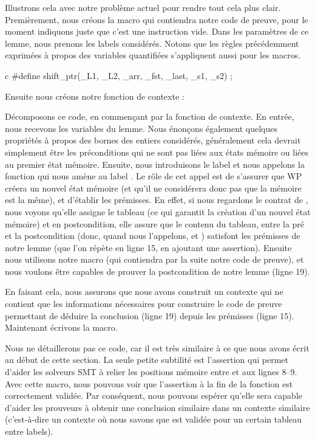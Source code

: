 Illustrons cela avec notre problème actuel pour rendre tout cela plus clair.
Premièrement, nous créons la macro  qui contiendra notre
code de preuve, pour le moment indiquons juste que c'est une instruction vide.
Dans les paramètres de ce lemme, nous prenons les labels considérés. Notons que
les règles précédemment exprimées à propos des variables quantifiées s'appliquent
aussi pour les macros.


\begin{CodeBlock}{c}
#define shift_ptr(_L1, _L2, _arr, _fst, _last, _s1, _s2) ;
\end{CodeBlock}


Ensuite nous créons notre fonction de contexte :




Décomposons ce code, en commençant par la fonction de contexte. En entrée, nous
recevons les variables du lemme. Nous énonçons également quelques propriétés à
propos des bornes des entiers considérés, généralement cela devrait simplement
être les préconditions qui ne sont pas liées aux états mémoire ou liées au
premier état mémoire. Ensuite, nous introduisons le label  et nous
appelons la fonction  qui nous amène au label
. Le rôle de cet appel est de s'assurer que WP créera un nouvel
état mémoire (et qu'il ne considérera donc pas que la mémoire est la même), et
d'établir les prémisses. En effet, si nous regardons le contrat de
, nous voyons qu'elle assigne le tableau (ce qui
garantit la création d'un nouvel état mémoire) et en postcondition, elle assure
que le contenu du tableau, entre la pré et la postcondition (donc, quand nous
l'appelons,  et ) satisfont les prémisses de notre
lemme (que l'on répète en ligne 15, en ajoutant une assertion). Ensuite nous
utilisons notre macro  (qui contiendra par la suite notre
code de preuve), et nous voulons être capables de prouver la postcondition de
notre lemme (ligne 19).


En faisant cela, nous assurons que nous avons construit un contexte qui ne
contient que les informations nécessaires pour construire le code de preuve
permettant de déduire la conclusion (ligne 19) depuis les prémisses (ligne 15).
Maintenant écrivons la macro.




Nous ne détaillerons pas ce code, car il est très similaire à ce que nous avons
écrit au début de cette section. La seule petite subtilité est l'assertion qui
permet d'aider les solveurs SMT à relier les positions mémoire entre
 et  aux lignes 8--9. Avec cette macro, nous
pouvons voir que l'assertion à la fin de la fonction
 est correctement validée. Par
conséquent, nous pouvons espérer qu'elle sera capable d'aider les prouveurs à
obtenir une conclusion similaire dans un contexte similaire (c'est-à-dire un
contexte où nous savons que  est validée pour un certain
tableau entre labels).


